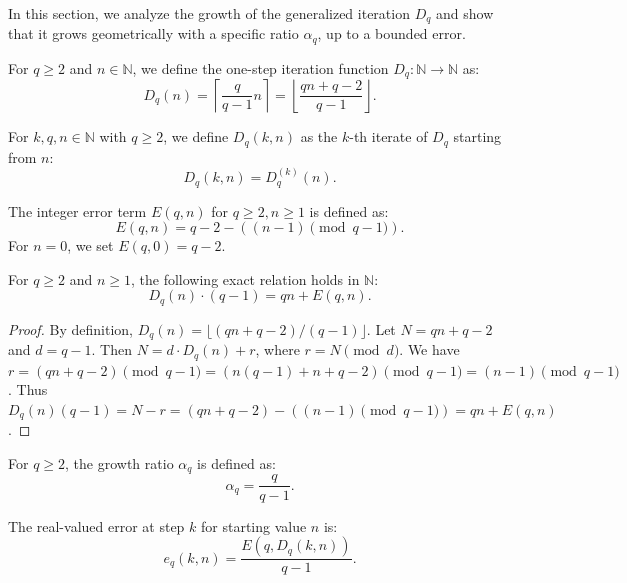 \label{sec:asymptotic}

In this section, we analyze the growth of the generalized iteration $D_q$ and show that it grows geometrically with a specific ratio $\alpha_q$, up to a bounded error.

\begin{definition}
  \label{def:Dstep}
  \leanok
  For $q \ge 2$ and $n \in \mathbb{N}$, we define the one-step iteration function $D_q: \mathbb{N} \to \mathbb{N}$ as:
  \[ D_q(n) = \left\lceil \frac{q}{q-1} n \right\rceil = \left\lfloor \frac{qn + q - 2}{q - 1} \right\rfloor. \]
\end{definition}

\begin{definition}
  \label{def:Diter'}
  \leanok
  For $k, q, n \in \mathbb{N}$ with $q \ge 2$, we define $D_q(k, n)$ as the $k$-th iterate of $D_q$ starting from $n$:
  \[ D_q(k, n) = D_q^{(k)}(n). \]
\end{definition}

\begin{definition}
  \label{def:E}
  \leanok
  The integer error term $E(q, n)$ for $q \ge 2, n \ge 1$ is defined as:
  \[ E(q, n) = q - 2 - ((n - 1) \pmod{q - 1}). \]
  For $n=0$, we set $E(q, 0) = q - 2$.
\end{definition}

\begin{lemma}
  \label{lemma:Dstep_exact}
  \leanok
  For $q \ge 2$ and $n \ge 1$, the following exact relation holds in $\mathbb{N}$:
  \[ D_q(n) \cdot (q - 1) = qn + E(q, n). \]
  \begin{proof}
    \leanok
    By definition, $D_q(n) = \lfloor (qn + q - 2) / (q - 1) \rfloor$. Let $N = qn + q - 2$ and $d = q - 1$.
    Then $N = d \cdot D_q(n) + r$, where $r = N \pmod d$.
    We have $r = (qn + q - 2) \pmod{q-1} = (n(q-1) + n + q - 2) \pmod{q-1} = (n - 1) \pmod{q-1}$.
    Thus $D_q(n)(q-1) = N - r = (qn + q - 2) - ((n - 1) \pmod{q-1}) = qn + E(q, n)$.
  \end{proof}
\end{lemma}

\begin{definition}
  \label{def:alpha}
  \leanok
  For $q \ge 2$, the growth ratio $\alpha_q$ is defined as:
  \[ \alpha_q = \frac{q}{q-1}. \]
\end{definition}

\begin{definition}
  \label{def:e_step}
  \leanok
  The real-valued error at step $k$ for starting value $n$ is:
  \[ e_q(k, n) = \frac{E(q, D_q(k, n))}{q - 1}. \]
\end{definition}

